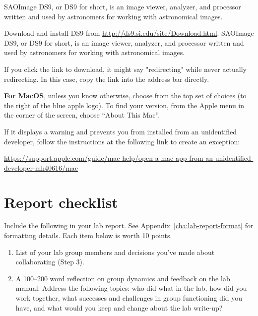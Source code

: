 SAOImage DS9, or DS9 for short, is an image viewer, analyzer, and processor written and used by astronomers for working with astronomical images.

\begin{steps}
	\item Download and install DS9 from \url{http://ds9.si.edu/site/Download.html}. SAOImage DS9, or DS9 for short, is an image viewer, analyzer, and processor written and used by astronomers for working with astronomical images.
	
	If you click the link to download, it might say "redirecting" while never actually redirecting. In this case, copy the link into the address bar directly.
	\begin{framed}	
		\textbf{For MacOS}, unless you know otherwise, choose from the top set of choices (to the right of
		the blue apple logo). To find your version, from the Apple menu in the corner of the screen,
		choose “About This Mac”.
		
		If it displays a warning and prevents you from installed from an unidentified developer, follow the instructions at the following link to create an exception:
		
		\url{https://support.apple.com/guide/mac-help/open-a-mac-app-from-an-unidentified-developer-mh40616/mac}
	\end{framed}
\end{steps}

\section{Report checklist}

Include the following in your lab report. See Appendix~\ref{cha:lab-report-format} for formatting details. Each item below is worth 10 points.

\begin{enumerate}
	\item List of your lab group members and decisions you've made about collaborating (Step 3).
	
	\item A 100--200 word reflection on group dynamics and feedback on the lab manual. Address the following topics: who did what in the lab, how did you work together, what successes and challenges in group functioning did you have, and what would you keep and change about the lab write-up?
\end{enumerate}